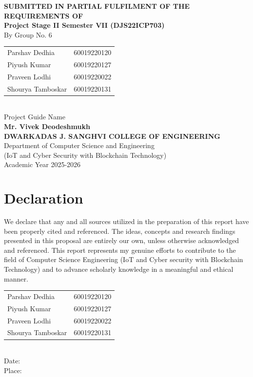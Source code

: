 \documentclass[12pt,a4paper]{article}
\begin{document}
\begin{titlepage}
    \centering
    \vspace*{1cm}
    {\Large \textbf{SUBMITTED IN PARTIAL FULFILMENT OF THE REQUIREMENTS OF}}\\[1cm]
    {\large \textbf{Project Stage II Semester VII (DJS22ICP703)}}\\[1cm]
    {\large By Group No. 6}\\[0.5cm]
    \begin{tabular}{ll}
    Parshav Dedhia & 60019220120 \\
    Piyush Kumar & 60019220127 \\
    Praveen Lodhi & 60019220022 \\
    Shourya Tamboskar & 60019220131 \\
    \end{tabular}\\[1.5cm]
    
    {\large Project Guide Name}\\[0.2cm]
    {\large \textbf{Mr. Vivek Deodeshmukh}}\\[2cm]
    
    {\Large \textbf{DWARKADAS J. SANGHVI COLLEGE OF ENGINEERING}}\\[0.5cm]
    {\large Department of Computer Science and Engineering\\
    (IoT and Cyber Security with Blockchain Technology)}\\[1.5cm]
    
    {\large Academic Year 2025-2026}
\end{titlepage}

\newpage
\section*{Declaration}
We declare that any and all sources utilized in the preparation of this report have been properly cited and referenced. The ideas, concepts and research findings presented in this proposal are entirely our own, unless otherwise acknowledged and referenced. This report represents my genuine efforts to contribute to the field of Computer Science Engineering (IoT and Cyber security with Blockchain Technology) and to advance scholarly knowledge in a meaningful and ethical manner.\\[1cm]

\noindent
\begin{tabular}{ll}
Parshav Dedhia & 60019220120 \\
Piyush Kumar & 60019220127 \\
Praveen Lodhi & 60019220022 \\
Shourya Tamboskar & 60019220131 \\
\end{tabular}\\[1cm]
\noindent Date: \hrulefill \\
Place: \hrulefill
\end{document}
